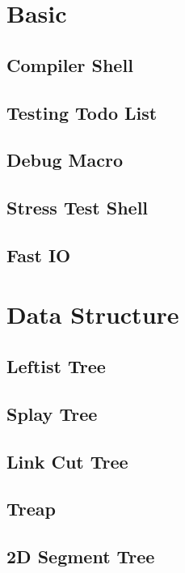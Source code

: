 \section{Basic}
\subsection{Compiler Shell}

\subsection{Testing Todo List}

\subsection{Debug Macro}

\subsection{Stress Test Shell}

\subsection{Fast IO}


\section{Data Structure}
\subsection{Leftist Tree}

\subsection{Splay Tree}

\subsection{Link Cut Tree}

\subsection{Treap}

\subsection{2D Segment Tree}

